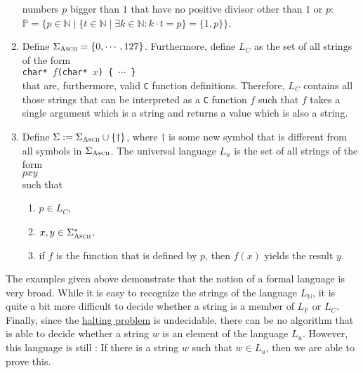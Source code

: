 \begin{enumerate}
      numbers $p$ bigger than $1$ that have no positive divisor other than $1$ or $p$:
      \\[0.2cm]
      \hspace*{1.3cm}
      $\mathbb{P} = \bigl\{ p \in \mathbb{N} \;\big|\; \{ t \in \mathbb{N} \mid \exists k \in
      \mathbb{N} : k \cdot t = p \} = \{1, p\} \bigr\}$.
\item Define $\Sigma_{\textsc{\scriptsize Ascii}} = \{ 0, \cdots, 127\}$.  Furthermore, define $L_C$
      as the set of all strings of the form
      \\[0.2cm]
      \hspace*{1.3cm}
      \texttt{char* $f$(char* $x$) \{ $\cdots$ \}}
      \\[0.2cm]
      that are, furthermore, valid \texttt{C} function definitions.
      Therefore,  $L_C$ contains all those strings that can be interpreted as a \texttt{C} function $f$
      such that $f$ takes a single argument which is a string and returns a value which is also a
      string.
\item Define $\Sigma := \Sigma_{\textsc{\scriptsize Ascii}} \cup \{\dag\}$, where
      $\mathtt{\dag}$ is some new symbol that is different from all symbols in
      $\Sigma_{\textsc{\scriptsize Ascii}}$.
      The universal language $L_u$ is the set of all strings of the form
      \\[0.2cm]
      \hspace*{1.3cm}
      $p$\dag$x$\dag$y$
      \\[0.2cm]
      such that
      \begin{enumerate}
      \item $p \in L_C$,
      \item $x,y \in \Sigma_{\textsc{Ascii}}^*$,
      \item if $f$ is the function that is defined by $p$, then $f(x)$ yields the result $y$.
            \eox
      \end{enumerate}
\end{enumerate}
The examples given above demonstrate that the notion of a formal language is very broad.
While it is easy to recognize the strings of the language $L_\mathbb{N}$, it is quite a bit more
difficult to decide whether a string is a member of 
$L_\mathbb{P}$ or $L_C$.  Finally, since the
\href{https://en.wikipedia.org/wiki/Halting_problem}{halting problem} is undecidable, there can be 
no algorithm that is able to decide whether a string  
$w$ is an element of the language $L_u$. However, this language is still :  If there is a string
$w$ such that $w \in L_u$, then we are able to prove this.

